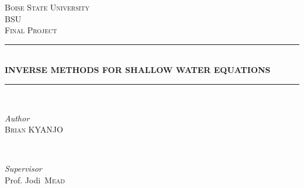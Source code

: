 \documentclass[12pt,a4paper]{article}
\begin{document}
	
	
	\begin{titlepage} %
		
		\newcommand{\HRule}{\rule{\linewidth}{0.5mm}} %
		
		\center %
		
		
		\textsc{\LARGE Boise State University}\\[1.5cm] %
		
		\textsc{\Large BSU}\\[0.5cm] %
		
		\textsc{\large Final Project}\\[0.5cm] %
		
		
		\HRule\\[0.4cm]
		
		{\huge\bfseries INVERSE METHODS FOR  SHALLOW WATER  EQUATIONS }\\[0.4cm] %
		
		\HRule\\[1.5cm]
		
		
		\begin{minipage}{0.4\textwidth}
			\begin{flushleft}
				\large
				\textit{Author}\\
				 \textsc{Brian KYANJO} %
			\end{flushleft}
		\end{minipage}
		~
		\begin{minipage}{0.4\textwidth}
			\begin{flushright}
				\large
				\textit{Supervisor}\\
				Prof. Jodi\textsc{~Mead} %
			\end{flushright}
		\end{minipage}
		

\end{titlepage}
\end{document}
